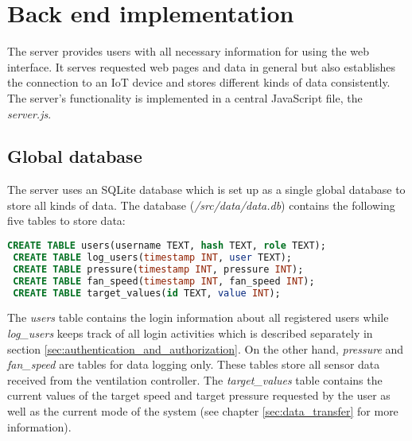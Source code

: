 \chapter{Back end implementation}
\label{ch:back_end_implementation}

The server provides users with all necessary information for using the web interface. It serves requested web pages and data in general but also establishes the connection to an IoT device and stores different kinds of data consistently. The server's functionality is implemented in a central JavaScript file, the \textit{server.js}.





\section{Global database}
\label{sec:global_database}

The server uses an SQLite database which is set up as a single global database to store all kinds of data.  The database (\textit{/src/data/data.db}) contains the following five tables to store data:

\begin{lstlisting}[language = SQL, numbers = none, label={lst:global_database}]
 CREATE TABLE users(username TEXT, hash TEXT, role TEXT);
 CREATE TABLE log_users(timestamp INT, user TEXT);
 CREATE TABLE pressure(timestamp INT, pressure INT);
 CREATE TABLE fan_speed(timestamp INT, fan_speed INT);
 CREATE TABLE target_values(id TEXT, value INT);
\end{lstlisting}

The \textit{users} table contains the login information about all registered users while \textit{log\_users} keeps track of all login activities which is described separately in section \ref{sec:authentication_and_authorization}. On the other hand, \textit{pressure} and \textit{fan\_speed} are tables for data logging only. These tables store all sensor data received from the ventilation controller. The \textit{target\_values} table contains the current values of the target speed and target pressure requested by the user as well as the current mode of the system (see chapter \ref{sec:data_transfer} for more information).




